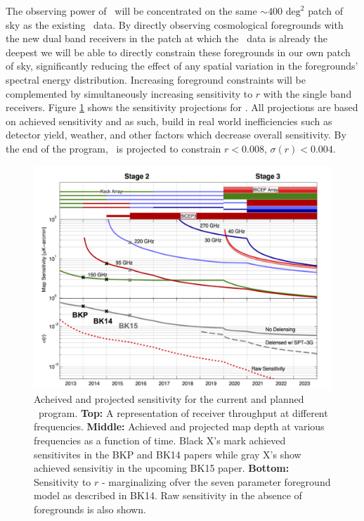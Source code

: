 \documentclass[]{spie}  %
\begin{document}
The observing power of \biceparray\ will be concentrated on the same $\sim400
\text{ deg}^2$ patch of sky as the existing \bk\ data. By directly
observing cosmological foregrounds with the new dual band receivers in the
patch at which the \bk\ data is already the deepest we will be able to
directly constrain these foregrounds in our own patch of sky, significantly
reducing the effect of any spatial variation in the foregrounds' spectral
energy distribution. Increasing foreground constraints will be complemented by
simultaneously increasing sensitivity to $r$ with the single band receivers. Figure \ref{fig:projections} shows the sensitivity projections for \biceparray. All projections are based on achieved sensitivity and as such, build in real world inefficiencies such as detector yield, weather, and other factors which decrease overall sensitivity. By the end of the program, \biceparray\ is projected to constrain $r<0.008$, $\sigma (r)<0.004$.


\begin{figure}[hb]
\center
\includegraphics[scale=0.4]{projections.pdf}
\caption{Acheived and projected sensitivity for the current and planned \bk\ program. \textbf{Top:} A representation of receiver throughput at different frequencies. \textbf{Middle:} Achieved and projected map depth at various frequencies as a function of time. Black X's mark achieved sensitivites in the BKP\cite{bkp} and BK14\cite{bk14} papers while gray X's show achieved sensivitiy in the upcoming BK15 paper. \textbf{Bottom:} Sensitivity to $r$ - marginalizing ofver the seven parameter foreground model as described in BK14. Raw sensitivity in the absence of foregrounds is also shown.}
\label{fig:projections}
\end{figure}









\end{document}
